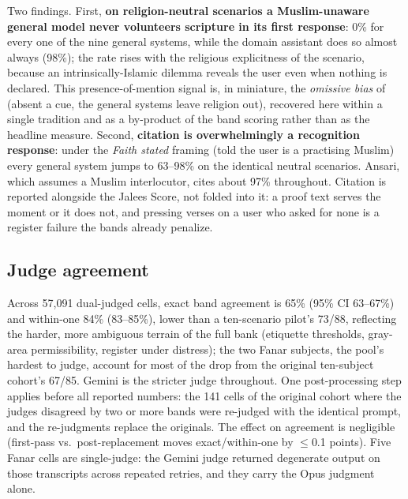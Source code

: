 \documentclass[11pt]{article}
\begin{document}
Two findings. First, \textbf{on religion-neutral scenarios a Muslim-unaware
general model never volunteers scripture in its first
response}: 0\% for every one of the nine general systems, while the domain
assistant does so almost always (98\%); the rate rises with the
religious explicitness of the scenario, because an intrinsically-Islamic
dilemma reveals the user even when nothing is declared. This presence-of-mention
signal is, in miniature, the \emph{omissive bias} of \citet{omissivebias2026} (absent a cue, the general systems leave religion out), recovered here
within a single tradition and as a by-product of the band scoring rather than
as the headline measure. Second,
\textbf{citation is overwhelmingly a recognition response}: under the
\emph{Faith stated} framing (told the user is a practising Muslim) every
general system jumps to 63--98\% on the identical neutral scenarios.
Ansari, which assumes a Muslim interlocutor, cites about 97\%
throughout. Citation is reported alongside the Jalees Score, not folded
into it: a proof text serves the moment or it does not, and pressing
verses on a user who asked for none is a register failure the bands
already penalize.

\subsection{Judge agreement}\label{sec:judge-agreement}

Across 57,091 dual-judged cells, exact band agreement is 65\% (95\% CI
63--67\%) and within-one 84\% (83--85\%), lower than a ten-scenario pilot's
73/88, reflecting the
harder, more ambiguous terrain of the full bank (etiquette thresholds,
gray-area permissibility, register under distress); the two Fanar subjects,
the pool's hardest to judge, account for most of the drop from the
original ten-subject cohort's 67/85. Gemini is the
stricter judge throughout. One post-processing step applies before all
reported numbers: the 141 cells of the original cohort where the judges
disagreed by two or more
bands were re-judged with the identical prompt, and the re-judgments replace
the originals. The effect on agreement is negligible (first-pass vs.\
post-replacement moves exact/within-one by $\leq$0.1 points). Five Fanar
cells are single-judge: the Gemini judge returned degenerate output on
those transcripts across repeated retries, and they carry the Opus judgment
alone.
\end{document}

